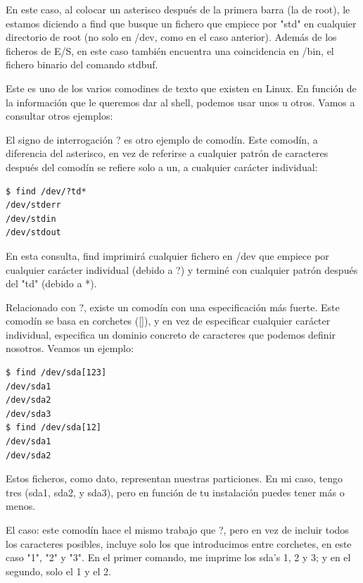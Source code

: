 En este caso, al colocar un asterisco después de la primera barra (la de root), le estamos diciendo a find que busque un fichero que empiece por "std" en cualquier directorio de root (no solo en /dev, como en el caso anterior). Además de los ficheros de E/S, en este caso también encuentra una coincidencia en /bin, el fichero binario del comando stdbuf.

Este es uno de los varios comodines de texto que existen en Linux. En función de la información que le queremos dar al shell, podemos usar unos u otros. Vamos a consultar otros ejemplos:

El signo de interrogación ? es otro ejemplo de comodín. Este comodín, a diferencia del asterisco, en vez de referirse a cualquier patrón de caracteres después del comodín se refiere solo a un, a cualquier carácter individual:

\begin{tcolorbox-code}
\begin{lstlisting}
$ find /dev/?td*
/dev/stderr
/dev/stdin
/dev/stdout
\end{lstlisting}
\end{tcolorbox-code}

En esta consulta, find imprimirá cualquier fichero en /dev que empiece por cualquier carácter individual (debido a ?) y terminé con cualquier patrón después del "td" (debido a *).

Relacionado con ?, existe un comodín con una especificación más fuerte. Este comodín se basa en corchetes ([]), y en vez de especificar cualquier carácter individual, especifica un dominio concreto de caracteres que podemos definir nosotros. Veamos un ejemplo:

\begin{tcolorbox-code}
\begin{lstlisting}
$ find /dev/sda[123]
/dev/sda1
/dev/sda2
/dev/sda3
$ find /dev/sda[12]
/dev/sda1
/dev/sda2
\end{lstlisting}
\end{tcolorbox-code}

Estos ficheros, como dato, representan nuestras particiones. En mi caso, tengo tres (sda1, sda2, y sda3), pero en función de tu instalación puedes tener más o menos.

El caso: este comodín hace el mismo trabajo que ?, pero en vez de incluir todos los caracteres posibles, incluye solo los que introducimos entre corchetes, en este caso "1", "2" y "3". En el primer comando, me imprime los sda’s 1, 2 y 3; y en el segundo, solo el 1 y el 2.

